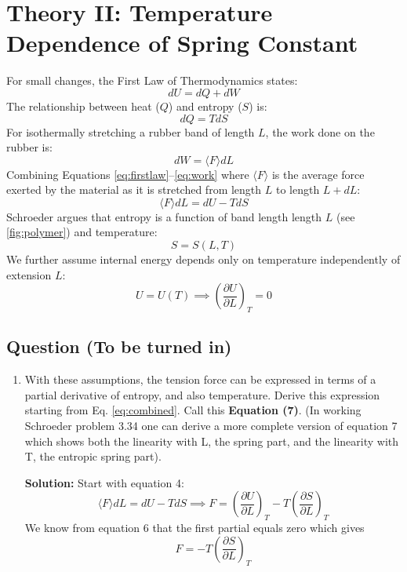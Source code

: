 \documentclass[12pt]{article}     %
\begin{document}
\section{Theory II: Temperature Dependence of Spring Constant}

For small changes, the First Law of Thermodynamics states:
\begin{equation} \label{eq:firstlaw}
    dU = dQ + dW
\end{equation}
The relationship between heat ($Q$) and entropy ($S$) is:
\begin{equation} \label{eq:heat}
    dQ = TdS
\end{equation}
For isothermally stretching a rubber band of length $L$, the work done on the rubber is:
\begin{equation} \label{eq:work}
    dW = \langle F \rangle dL
\end{equation}
Combining Equations \ref{eq:firstlaw}--\ref{eq:work} where $\langle F \rangle$ is the average force exerted by the material as it is stretched from length $L$ to length $L+dL$:
\begin{equation} \label{eq:combined}
    \langle F \rangle dL = dU - TdS
\end{equation}
Schroeder argues that entropy is a function of band length length $L$ (see \ref{fig:polymer}) and temperature:
\begin{equation} \label{eq:entropy funtion}
    S = S(L, T)
\end{equation}
We further assume internal energy depends only on temperature independently of extension $L$:
\begin{equation}
    U = U(T) \implies \left(\frac{\partial U}{\partial L}\right)_{T} = 0
\end{equation}


\subsection*{Question (To be turned in)}
\begin{enumerate}[label=\Alph*), start=4]
    \item With these assumptions, the tension force can be expressed in terms of a partial derivative of entropy, and also temperature. Derive this expression starting from Eq. \ref{eq:combined}. Call this \textbf{Equation (7)}.  (In working Schroeder problem 3.34 one can derive a more complete version of equation 7 which shows both the linearity with L, the spring part, and the linearity with T, the entropic spring part).

    {\bfseries Solution:} Start with equation 4: 
    $$\langle F \rangle dL = dU - TdS \implies F = \left(\frac{\partial U}{\partial L}\right)_{T} - T \left(\frac{\partial S}{\partial L}\right)_{T}$$
    We know from equation 6 that the first partial equals zero which gives
    \begin{equation}
        F = -T \left(\frac{\partial S}{\partial L}\right)_{T}
    \end{equation}

\end{enumerate}
\end{document}
